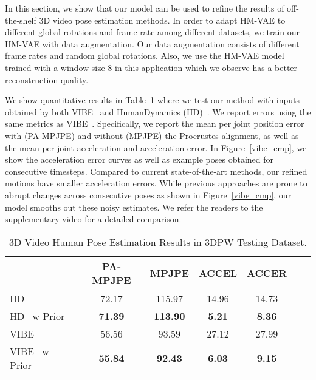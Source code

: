 In this section, we show that our model can be used to refine the results of off-the-shelf 3D video pose estimation methods. In order to adapt HM-VAE to different global rotations and frame rate among different datasets, we train our HM-VAE with data augmentation.
Our data augmentation consists of different frame rates and random global rotations.
Also, we use the HM-VAE model trained with a window size 8 in this application which we observe has a better reconstruction quality.


We show quantitative results in Table~\ref{table:pose-estimate-res} where we test our method with inputs obtained by both VIBE~\cite{kocabas2020vibe} and HumanDynamics (HD)~\cite{kanazawa2019learning}. We report errors using the same metrics as VIBE~\cite{kocabas2020vibe}. Specifically, we report the mean per joint position error with (PA-MPJPE) and without (MPJPE) the Procrustes-alignment, as well as the mean per joint acceleration and acceleration error. In Figure~\ref{vibe_cmp}, we show the acceleration error curves as well as example poses obtained for consecutive timesteps. Compared to current state-of-the-art methods, our refined motions have smaller acceleration errors. While previous approaches are prone to abrupt changes across consecutive poses as shown in Figure~\ref{vibe_cmp}, our model smooths out these noisy estimates. We refer the readers to the supplementary video for a detailed comparison.      


\begin{table}[t!]
\small
\begin{center}
\footnotesize{
\setlength{\tabcolsep}{5pt}
\begin{tabular}{@{}l||cccccc@{}} 
\hline
 & PA-MPJPE  & MPJPE & ACCEL& ACCER \\ \hline\hline
HD~\cite{kanazawa2019learning} & 72.17 & 115.97 & 14.96 & 14.73 \\ \hline
HD~\cite{kanazawa2019learning} w Prior & \textbf{71.39} & \textbf{113.90} & \textbf{5.21} & \textbf{8.36} \\ \hline
VIBE~\cite{kocabas2020vibe} & 56.56 & 93.59 & 27.12 & 27.99  \\ \hline
VIBE~\cite{kocabas2020vibe} w Prior & \textbf{55.84} & \textbf{92.43} & \textbf{6.03} & \textbf{9.15}  \\ \hline
\end{tabular}
}
\end{center}
\vspace{-4mm}
\caption{\small 3D Video Human Pose Estimation Results in 3DPW Testing Dataset. }
\label{table:pose-estimate-res}
\vspace{-4mm}
\end{table}




